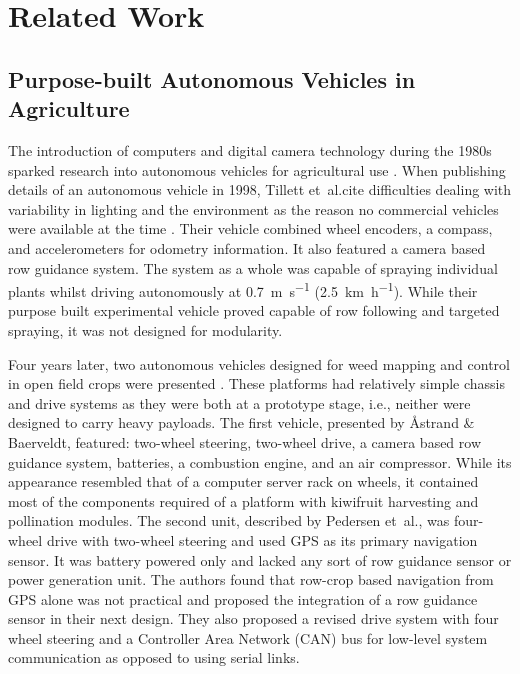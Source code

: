 \documentclass[preprint,authoryear,12pt]{elsarticle}
\begin{document}
\section{Related Work}
\label{sect:review}

    \subsection{Purpose-built Autonomous Vehicles in Agriculture}

        The introduction of computers and digital camera technology during the 1980s sparked research into autonomous vehicles for agricultural use \citep{Li2009}.
        When publishing details of an autonomous vehicle in 1998, Tillett et~al.\@ cite difficulties dealing with variability in lighting and the environment as the reason no commercial vehicles were available at the time \citep{Tillett1998}.
        Their vehicle combined wheel encoders, a compass, and accelerometers for odometry information.
        It also featured a camera based row guidance system.
        The system as a whole was capable of spraying individual plants whilst driving autonomously at \SI{0.7}{\meter\per\second} (\SI{2.5}{\kilo\meter\per\hour}).
        While their purpose built experimental vehicle proved capable of row following and targeted spraying, it was not designed for modularity.




        Four years later, two autonomous vehicles designed for weed mapping and control in open field crops were presented \citep{Pedersen2002,Astrand2002}.
        These platforms had relatively simple chassis and drive systems as they were both at a prototype stage, i.e., neither were designed to carry heavy payloads.
        The first vehicle, presented by Åstrand \& Baerveldt, featured: two-wheel steering, two-wheel drive, a camera based row guidance system, batteries, a combustion engine, and an air compressor.
        While its appearance resembled that of a computer server rack on wheels, it contained most of the components required of a platform with kiwifruit harvesting and pollination modules.
        The second unit, described by Pedersen et~al.\@, was four-wheel drive with two-wheel steering and used GPS as its primary navigation sensor.
        It was battery powered only and lacked any sort of row guidance sensor or power generation unit.
        The authors found that row-crop based navigation from GPS alone was not practical and proposed the integration of a row guidance sensor in their next design.
        They also proposed a revised drive system with four wheel steering and a Controller Area Network (CAN) bus for low-level system communication as opposed to using serial links.
\end{document}
